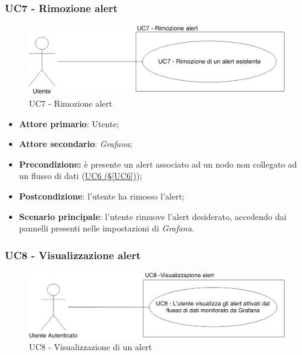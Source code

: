 \newpage

\subsubsection{UC7 - Rimozione alert}\label{UC7}

\begin{figure}[H]
	\centering
	\includegraphics[scale=0.4]{./images/UC7.png}
	\caption{UC7 - Rimozione alert}
\end{figure}

\begin{itemize}
	\item \textbf{Attore primario}: Utente;
	\item \textbf{Attore secondario}: \textit{Grafana};
	\item \textbf{Precondizione:} è presente un alert associato ad un nodo non collegato ad un flusso di dati
	(\hyperref[UC6]{UC6 (§\ref*{UC6})});
	\item \textbf{Postcondizione}: l'utente ha rimosso l'alert;
	\item \textbf{Scenario principale}: l'utente rimuove l'alert desiderato, accedendo dai pannelli presenti nelle impostazioni di \textit{Grafana}.
\end{itemize}

\pagebreak

\subsubsection{UC8 - Visualizzazione alert}\label{UC8}

\begin{figure}[H]
	\centering
	\includegraphics[scale=0.4]{./images/UC8.png}
	\caption{UC8 - Visualizzazione di un alert}
\end{figure}


